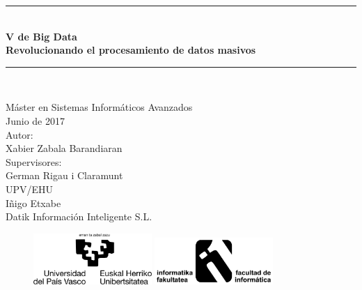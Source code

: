 \pagestyle{empty}

\newcommand{\HRule}{\rule{\linewidth}{0.5mm}} 

\begin{center}
	\HRule \\[0.5cm]
	\vspace{0.5cm}
	\textbf {
		{\huge V de Big Data}\\
		\vspace{0.3 cm}
		Revolucionando el procesamiento de datos masivos\\
	}
	\vspace{0.5cm}
	\HRule \\[0.5cm]
	{\large
		
		\vspace{1 cm}
		Máster en Sistemas Informáticos Avanzados\\
		Junio de 2017\\
		\vspace{3.0 cm}
		Autor:\\
		\vspace{0.2 cm}
		Xabier Zabala Barandiaran\\
		\vspace{1.0 cm}
		Supervisores:\\
		\vspace{0.2 cm}
		German Rigau i Claramunt\\
		{\small UPV/EHU\\}
		Iñigo Etxabe\\
		{\small Datik Información Inteligente S.L.\\}
	}

	\vspace{2.0 cm} 
	\begin{figure}[h!]
		\centering
		\includegraphics[width=0.4\textwidth]{Ilustraciones/ehu.png}\hfill
		\includegraphics[width=0.4\textwidth]{Ilustraciones/informatica.png}\hfill

	\end{figure}
\end{center}